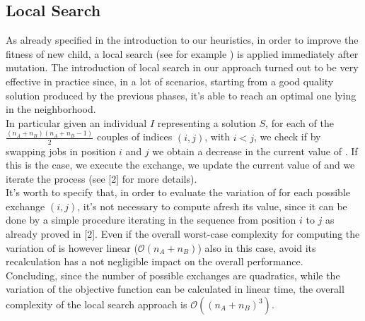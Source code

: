 \documentclass[opre,nonblindrev]{informs3} %
\begin{document}
\subsection{Local Search}
As already specified in the introduction to our heuristics, in order to improve the fitness of new child, a local search (see for example \cite{local}) is applied immediately after mutation. The introduction of local search in our approach turned out to be very effective in practice since, in a lot of scenarios, starting from a good quality solution produced by the previous phases, it's able to reach an optimal one lying in the neighborhood.\\
In particular given an individual $I$ representing a solution $S$, for each of the $\frac{(n_A+n_B)(n_A+n_B-1)}{2}$ couples of indices $(i,j)$, with $i<j$,  we check if by swapping jobs in position $i$ and $j$ we obtain a decrease in the current value of . If this is the case, we execute the exchange, we update the current value of  and we iterate the process (see [2] for more details).\\
It's worth to specify that, in order to evaluate the variation of  for each possible exchange $(i,j)$, it's not necessary to compute afresh its value, since it can be done by a simple procedure iterating in the sequence from position $i$ to $j$ as already proved in [2]. Even if the overall worst-case complexity for computing the variation of  is however linear ($\mathcal{O}(n_A+n_B)$) also in this case, avoid its recalculation has a not negligible impact on the overall performance.\\
Concluding, since the number of possible exchanges are quadratics, while the variation of the objective function can be calculated in linear time, the overall complexity of the local search approach is $\mathcal{O}((n_A+n_B)^3)$.
\end{document}
